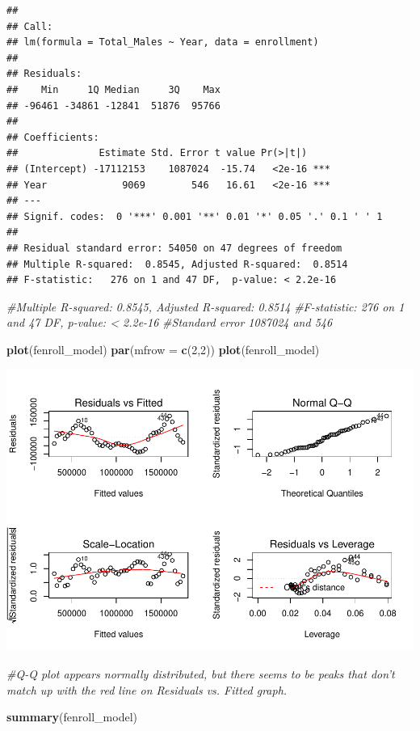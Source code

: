 \documentclass[]{article}
\newenvironment{Shaded}{\begin{snugshade}}{\end{snugshade}}
\newcommand{\KeywordTok}[1]{\textcolor[rgb]{0.13,0.29,0.53}{\textbf{#1}}}
\newcommand{\DataTypeTok}[1]{\textcolor[rgb]{0.13,0.29,0.53}{#1}}
\newcommand{\DecValTok}[1]{\textcolor[rgb]{0.00,0.00,0.81}{#1}}
\newcommand{\CommentTok}[1]{\textcolor[rgb]{0.56,0.35,0.01}{\textit{#1}}}
\newcommand{\NormalTok}[1]{#1}
\begin{document}
\begin{verbatim}
## 
## Call:
## lm(formula = Total_Males ~ Year, data = enrollment)
## 
## Residuals:
##    Min     1Q Median     3Q    Max 
## -96461 -34861 -12841  51876  95766 
## 
## Coefficients:
##              Estimate Std. Error t value Pr(>|t|)    
## (Intercept) -17112153    1087024  -15.74   <2e-16 ***
## Year             9069        546   16.61   <2e-16 ***
## ---
## Signif. codes:  0 '***' 0.001 '**' 0.01 '*' 0.05 '.' 0.1 ' ' 1
## 
## Residual standard error: 54050 on 47 degrees of freedom
## Multiple R-squared:  0.8545, Adjusted R-squared:  0.8514 
## F-statistic:   276 on 1 and 47 DF,  p-value: < 2.2e-16
\end{verbatim}

\begin{Shaded}
\begin{Highlighting}[]
\CommentTok{#Multiple R-squared:  0.8545,   Adjusted R-squared:  0.8514 }
\CommentTok{#F-statistic:   276 on 1 and 47 DF,  p-value: < 2.2e-16}
\CommentTok{#Standard error  1087024 and 546}

\KeywordTok{plot}\NormalTok{(fenroll_model)}
\KeywordTok{par}\NormalTok{(}\DataTypeTok{mfrow =} \KeywordTok{c}\NormalTok{(}\DecValTok{2}\NormalTok{,}\DecValTok{2}\NormalTok{))}
\KeywordTok{plot}\NormalTok{(fenroll_model)}
\end{Highlighting}
\end{Shaded}

\includegraphics{Assignment_5_Markdown_files/figure-latex/unnamed-chunk-4-6.pdf}

\begin{Shaded}
\begin{Highlighting}[]
\CommentTok{#Q-Q plot appears normally distributed, but there seems to be peaks that don't match up with the red line on Residuals vs. Fitted graph.}

\KeywordTok{summary}\NormalTok{(fenroll_model)}
\end{Highlighting}
\end{Shaded}
\end{document}
